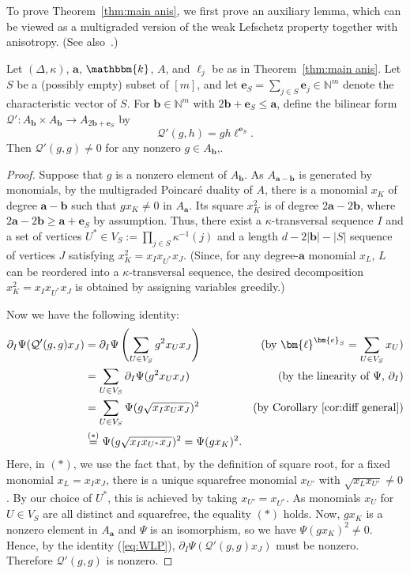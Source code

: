 To prove Theorem~\ref{thm:main anis}, we first prove an auxiliary lemma, which can be viewed as a multigraded version of the weak Lefschetz property together with anisotropy. (See also~\cite[Corollary 4.3]{KX}.)
\begin{lemma} \label{lemma:WLP anis}
Let $(\Delta,\kappa)$, $\bm{a}$, $\mathbbm{k}$, $A$, and $\ell_j$ be as in Theorem~\ref{thm:main anis}.
Let $S$ be a (possibly empty) subset of $[m]$, and let $\bm{e}_S=\sum_{j \in S} \bm{e}_j \in \mathbb{N}^m$ denote the characteristic vector of $S$.
For $\bm{b} \in \mathbb{N}^m$ with $2\bm{b}+\bm{e}_S \leq \bm{a}$, define the bilinear form $\mathcal{Q}' : A_{\bm{b}}\times A_{\bm{b}} \rightarrow A_{2\bm{b}+\bm{e}_S}$ by
\[
\mathcal{Q}'(g,h)=gh \bm{\ell}^{\bm{e}_S}.
\]
Then $\mathcal{Q}'(g,g)\neq 0$ for any nonzero $g \in A_{\bm{b}}$,.
\end{lemma}
\begin{proof}
Suppose that $g$ is a nonzero element of $A_{\bm{b}}$.
As $A_{\bm{a}-\bm{b}}$ is generated by monomials, by the multigraded Poincar\'{e} duality of $A$, there is a monomial $x_K$ of degree $\bm{a}-\bm{b}$ such that $gx_K \neq 0$ in $A_{\bm{a}}$. Its square $x_K^2$ is of degree $2\bm{a}-2\bm{b}$, where $2\bm{a}-2\bm{b} \geq \bm{a}+\bm{e}_S$ by assumption.
Thus, there exist a $\kappa$-transversal sequence $I$ and a set of vertices $U^* \in V_S:=\prod_{j \in S} \kappa^{-1}(j)$ and a length $d-2|\bm{b}|-|S|$ sequence of vertices $J$ satisfying $x_K^2=x_Ix_{U^*}x_J$. 
(Since, for any degree-$\bm{a}$ monomial $x_L$, $L$ can be reordered into a $\kappa$-transversal sequence, the desired decomposition $x_K^2=x_Ix_{U^*}x_J$ is obtained by assigning variables greedily.)

Now we have the following identity:
\begin{align}
\partial_I\Psi(\mathcal{Q}'(g,g)x_J) &= \partial_I \Psi\left(\sum_{U \in V_S}g^2 x_Ux_J\right) & \text{(by $\bm{\ell}^{\bm{e}_S}=\sum_{U \in V_S} x_U$)} \notag \\
&= \sum_{U \in V_S} \partial_I \Psi(g^2x_Ux_J) & \text{(by the linearity of $\Psi$, $\partial_I$)} \notag \\
&=\sum_{U \in V_S} \Psi(g\sqrt{x_Ix_Ux_J})^2 &\text{(by Corollary~\ref{cor:diff general})} \notag \\
&\overset{(*)}{=}\Psi(g\sqrt{x_Ix_{U^*}x_J})^2 = \Psi(g x_K)^2. \label{eq:WLP}
\end{align}
Here, in $(*)$, we use the fact that, by the definition of square root, for a fixed monomial $x_L=x_Ix_J$, there is a unique squarefree monomial $x_{U'}$ with $\sqrt{x_Lx_{U'}} \neq 0$.
By our choice of $U^*$, this is achieved by taking $x_{U'}=x_{U^*}$. 
As monomials $x_U$ for $U \in V_S$ are all distinct and squarefree, the equality $(*)$ holds.
Now, $g x_K$ is a nonzero element in $A_{\bm{a}}$ and $\Psi$ is an isomorphism, so we have $\Psi(g x_K)^2 \neq 0$.
Hence, by the identity (\ref{eq:WLP}), $\partial_I\Psi(\mathcal{Q}'(g,g) x_J)$ must be nonzero. Therefore $\mathcal{Q}'(g,g)$ is nonzero.
\end{proof}

